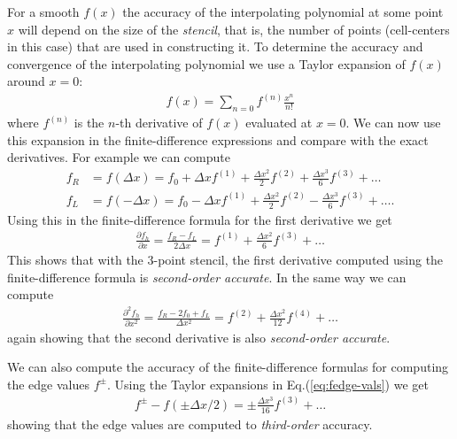 \documentclass[12pt]{article}
\theoremstyle{definition}
\theoremstyle{definition}
\theoremstyle{definition}
\newcommand{\eqr}[1]{Eq.\thinspace(#1)}
\begin{document}
For a smooth $f(x)$ the accuracy of the interpolating polynomial at
some point $x$ will depend on the size of the \emph{stencil}, that is,
the number of points (cell-centers in this case) that are used in
constructing it. To determine the accuracy and convergence of the
interpolating polynomial we use a Taylor expansion of $f(x)$ around
$x = 0$:
\begin{align}
  f(x) = \sum_{n=0} f^{(n)} \frac{x^n}{n!} \label{eq:taylor-f}
\end{align}
where $f^{(n)}$ is the $n$-th derivative of $f(x)$ evaluated at
$x=0$. We can now use this expansion in the finite-difference
expressions and compare with the exact derivatives. For example we can
compute
\begin{align}
  f_R 
  &= f(\Delta x) 
  = f_0 + \Delta x f^{(1)} + \frac{\Delta x^2}{2} f^{(2)}  
  + \frac{\Delta x^3}{6} f^{(3)}  + \ldots \\
  f_L
  &= f(-\Delta x) 
  = f_0 - \Delta x f^{(1)} + \frac{\Delta x^2}{2} f^{(2)}  
  - \frac{\Delta x^3}{6} f^{(3)}  + \ldots.
\end{align}
Using this in the finite-difference formula for the first derivative
we get
\begin{align}
  \frac{\partial f_h}{\partial x}
  =
  \frac{f_R - f_L}{2 \Delta x}
  =
  f^{(1)}
  +
  \frac{\Delta x^2}{6} f^{(3)} + \ldots
\end{align}
This shows that with the $3$-point stencil, the first derivative
computed using the finite-difference formula is \emph{second-order
  accurate}. In the same way we can compute
\begin{align}
  \frac{\partial^2 f_h}{\partial x^2}
  =
  \frac{f_R - 2 f_0 + f_L}{\Delta x^2}
  =
  f^{(2)}
  +
  \frac{\Delta x^2}{12} f^{(4)} + \ldots
\end{align}
again showing that the second derivative is also \emph{second-order
  accurate}.

We can also compute the accuracy of the finite-difference formulas for
computing the edge values $f^{\pm}$. Using the Taylor expansions in
\eqr{\ref{eq:fedge-vals}} we get
\begin{align}
  f^{\pm} - f(\pm \Delta x/2)
  = \pm \frac{\Delta x^3}{16} f^{(3)} + \ldots
\end{align}
showing that the edge values are computed to \emph{third-order}
accuracy.
\end{document}
